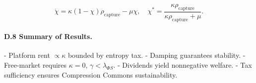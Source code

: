 \documentclass[12pt]{article}
\begin{document}
\[
\dot{\chi} = \kappa (1 - \chi) \rho_{\text{capture}} - \mu \chi, \quad \chi^* = \frac{\kappa \rho_{\text{capture}}}{\kappa \rho_{\text{capture}} + \mu}.
\]

\paragraph{D.8 Summary of Results.}

- Platform rent \(\propto \kappa\) bounded by entropy tax.
- Damping guarantees stability.
- Free-market requires \(\kappa = 0\), \(\gamma < \lambda_{\Phi S}\).
- Dividends yield nonnegative welfare.
- Tax sufficiency ensures Compression Commons sustainability.



\end{document}
